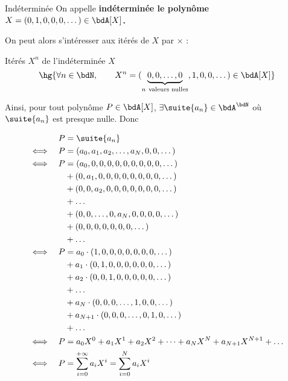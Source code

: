 \documentclass[a4paper,french,bookmarks]{article}
\begin{document}
\begin{definition}{Indéterminée}{}
    On appelle \bf{indéterminée} le polynôme $X = (0, 1, 0, 0, 0, \dots) \in \bdA[X]$.
\end{definition}

On peut alors s'intéresser aux itérés de $X$ par $\times$ :

\begin{property}{Itérés $X^n$ de l'indéterminée $X$}{}
    \[ \hg{\forall n \in \bdN, \qquad X^n = (\underbrace{0, 0, \dots, 0}_{n \ \text{valeurs nulles}}, 1, 0, 0, \dots) \in \bdA[X]}\]
\end{property}


Ainsi, pour tout polynôme $P \in \bdA[X]$, $\exists \suite{a_n} \in \bdA^\bdN$ où $\suite{a_n}$ est presque nulle. Donc

\begin{align*}
    && P &= \suite{a_n}\\
    \iff && P &= (a_0, a_1, a_2, \dots, a_N, 0, 0, \dots)\\
    \iff && P &= (a_0, 0, 0, 0, 0, 0, 0, 0, 0, 0, \dots )\\
    && &+ (0, a_1, 0, 0, 0, 0, 0, 0, 0, 0, \dots)\\
    && &+ (0, 0, a_2, 0, 0, 0, 0, 0, 0, 0, \dots)\\
    && &+ \dots\\
    && &+ (0, 0, \dots, 0, a_N, 0, 0, 0, 0, \dots)\\
    && &+ (0, 0, 0, 0, 0, 0, 0, \dots)\\
    && &+ \dots\\
    \iff && P &= a_0 \cdot (1, 0, 0, 0, 0, 0, 0, 0, \dots)\\
    && &+ a_1 \cdot (0, 1, 0, 0, 0, 0, 0, 0, \dots)\\
    && &+ a_2 \cdot (0, 0, 1, 0, 0, 0, 0, 0, \dots)\\
    && &+ \dots\\
    && &+ a_N \cdot (0, 0, 0, \dots, 1, 0, 0, \dots)\\
    && &+ a_{N+1} \cdot (0, 0, 0, \dots, 0, 1, 0, \dots)\\
    && &+ \dots\\
    \iff && P &= a_0X^0 + a_1X^1 + a_2X^2 + \dots + a_NX^N + a_{N+1}X^{N+1} + \dots\\
    \iff && P & = \sum_{i=0}^{+\infty} a_iX^i = \sum_{i=0}^{N} a_iX^i
\end{align*}
\end{document}
